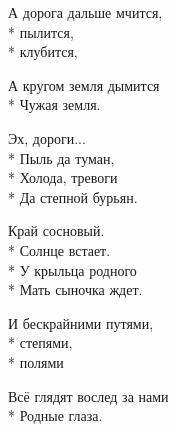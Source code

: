 \medskip

\begin{minipage}{\linewidth}
А дорога дальше мчится,\\*
пылится,\\*
клубится,\\
\end{minipage}\par\medskip\nobreak

\medskip

\begin{minipage}{\linewidth}
А кругом земля дымится\\*
Чужая земля.\\
\end{minipage}\par\medskip\nobreak

\medskip

\begin{minipage}{\linewidth}
\hspace*{1.5em}Эх, дороги...\\*
\hspace*{1.5em}Пыль да туман,\\*
\hspace*{1.5em}Холода, тревоги\\*
\hspace*{1.5em}Да степной бурьян.\\
\end{minipage}\par\medskip\nobreak

\medskip

\begin{minipage}{\linewidth}
Край сосновый.\\*
Солнце встает.\\*
У крыльца родного\\*
Мать сыночка ждет.\\
\end{minipage}\par\medskip\nobreak

\medskip

\begin{minipage}{\linewidth}
И бескрайними путями,\\*
степями,\\*
полями\\
\end{minipage}\par\medskip\nobreak

\medskip

\begin{minipage}{\linewidth}
Всё глядят вослед за нами\\*
Родные глаза.\\
\end{minipage}\par\medskip\nobreak

